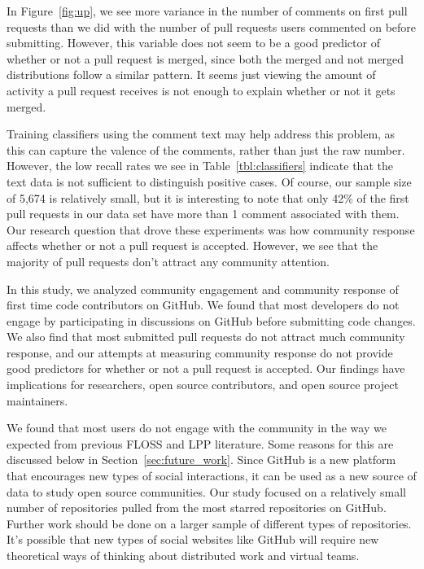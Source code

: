 \documentclass{iitthesis}
\begin{document}
In Figure~\ref{fig:up}, we see more variance in the number of comments on
first pull requests than we did with the number of pull requests users commented
on before submitting. However, this variable does not seem to be a good
predictor of whether or not a pull request is merged, since both the merged and
not merged distributions follow a similar pattern. It seems just viewing the
amount of activity a pull request receives is not enough to explain whether or
not it gets merged.

Training classifiers using the comment text may help address this problem, as
this can capture the valence of the comments, rather than just the raw number.
However, the low recall rates we see in Table~\ref{tbl:classifiers} indicate
that the text data is not sufficient to distinguish positive cases. Of course,
our sample size of 5,674 is relatively small, but it is interesting to note that
only 42\% of the first pull requests in our data set have more than 1 comment
associated with them. Our research question that drove these experiments was how
community response affects whether or not a pull request is accepted. However,
we see that the majority of pull requests don't attract any community attention.

 \label{chap:conclusion}

In this study, we analyzed community engagement and community response of first
time code contributors on GitHub. We found that most developers do not engage by
participating in discussions on GitHub before submitting code changes. We also
find that most submitted pull requests do not attract much community response,
and our attempts at measuring community response do not provide good predictors
for whether or not a pull request is accepted. Our findings have implications
for researchers, open source contributors, and open source project maintainers.

We found that most users do not engage with the community in the way we expected
from previous FLOSS and LPP literature. Some reasons for this are discussed
below in Section~\ref{sec:future_work}. Since GitHub is a new platform that
encourages new types of social interactions, it can be used as a new source of
data to study open source communities. Our study focused on a relatively small
number of repositories pulled from the most starred repositories on GitHub.
Further work should be done on a larger sample of different types of
repositories. It's possible that new types of social websites like GitHub will
require new theoretical ways of thinking about distributed work and virtual
teams.
\end{document}
